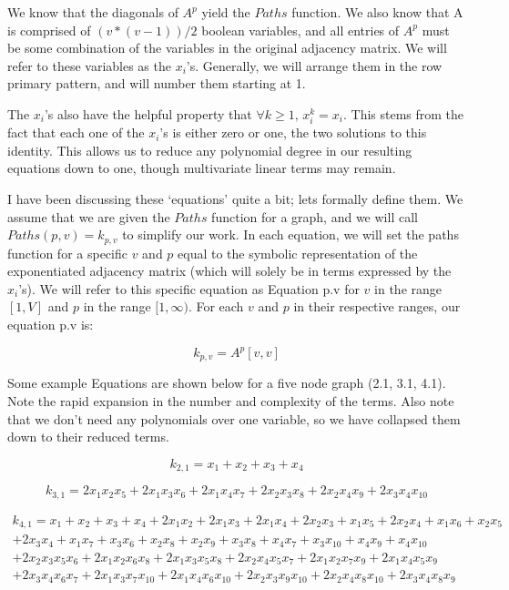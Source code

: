 We know that the diagonals of $A^p$ yield the $Paths$ function.
We also know that A is comprised of $(v * (v - 1)) / 2$ boolean variables, and all entries of $A^p$ must be some combination of the variables in the original adjacency matrix. 
We will refer to these variables as the $x_i$'s. Generally, we will arrange them in the row primary pattern, and will number them starting at 1.

The $x_i$'s also have the helpful property that $\forall k \geq 1,\, x_i^k = x_i $. 
This stems from the fact that each one of the $x_i$'s is either zero or one, the two solutions to this identity.  
This allows us to reduce any polynomial degree in our resulting equations down to one, though multivariate linear terms may remain.

I have been discussing these `equations' quite a bit; lets formally define them.  
We assume that we are given the $Paths$ function for a graph, and we will call $Paths(p, v) = k_{p, v}$ to simplify our work. 
In each equation, we will set the paths function for a specific $v$ and $p$ equal to the symbolic representation of the exponentiated adjacency matrix (which will solely be in terms expressed by the $x_i$'s).
We will refer to this specific equation as Equation p.v for $v$ in the range $[1, V]$ and $p$ in the range $[1, \infty)$.
For each $v$ and $p$ in their respective ranges, our equation p.v is:

$$k_{p, v} = A^p[v,v]$$

Some example Equations are shown below for a five node graph (2.1, 3.1, 4.1). 
Note the rapid expansion in the number and complexity of the terms.  
Also note that we don't need any polynomials over one variable, so we have collapsed them down to their reduced terms.

$$k_{2,1} = x_1 + x_2 + x_3 + x_4$$

$$k_{3,1} = 2x_1x_2x_5 + 2x_1x_3x_6 + 2x_1x_4x_7 + 2x_2x_3x_8 + 2x_2x_4x_9 + 2x_3x_4x_{10}$$

\begin{equation}\begin{aligned} k_{4,1} = x_1 + x_2 + x_3 + x_4 + 2x_1x_2 + 2x_1x_3 + 2x_1x_4 + 2x_2x_3 + x_1x_5 + 2x_2x_4 + x_1x_6 + x_2x_5 \\ + 2x_3x_4 + x_1x_7 + x_3x_6 + x_2x_8 + x_2x_9 + x_3x_8 + x_4x_7 + x_3x_{10} + x_4x_9 + x_4x_{10} \\ + 2x_2x_3x_5x_6 + 2x_1x_2x_6x_8 + 2x_1x_3x_5x_8 + 2x_2x_4x_5x_7 + 2x_1x_2x_7x_9 + 2x_1x_4x_5x_9 \\+ 2x_3x_4x_6x_7 + 2x_1x_3x_7x_{10} + 2x_1x_4x_6x_{10} + 2x_2x_3x_9x_{10} + 2x_2x_4x_8x_{10} + 2x_3x_4x_8x_9 \end{aligned}\end{equation}

